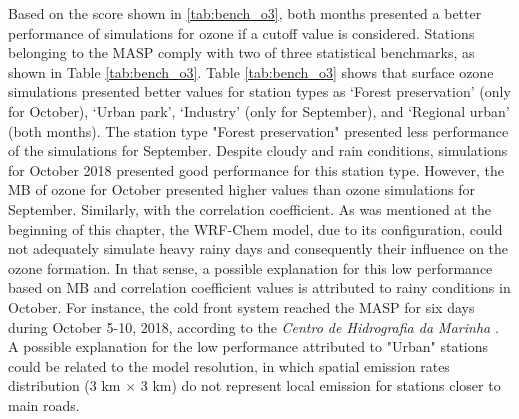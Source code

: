  Based on the score shown in \ref{tab:bench_o3}, both months presented a better performance of simulations for ozone if a cutoff value is considered. 
Stations belonging to the MASP comply with two of three statistical benchmarks, as shown in Table \ref{tab:bench_o3}.
Table \ref{tab:bench_o3} shows that surface ozone simulations presented better values for station types as `Forest preservation' (only for October), `Urban park', `Industry' (only for September), and `Regional urban' (both months).
The station type "Forest preservation" presented less performance of the simulations for September.
 Despite cloudy and rain conditions, simulations for October 2018 presented good performance for this station type.
 However, the MB of ozone for October presented higher values than ozone simulations for September.
 Similarly, with the correlation coefficient.
 As was mentioned at the beginning of this chapter, the WRF-Chem model, due to its configuration, could not adequately simulate heavy rainy days and consequently their influence on the ozone formation.
  In that sense, a possible explanation for this low performance based on MB and correlation coefficient values is attributed to rainy conditions in October. For instance, the cold front system reached the MASP for six days during October 5-10, 2018, according to the \textit{Centro de Hidrografia da Marinha} \citep{CHM2020}.
  A possible explanation for the low performance attributed to "Urban" stations could be related to the model resolution, in which spatial emission rates distribution (3 km $\times$ 3 km) do not represent local emission for stations closer to main roads.
  
